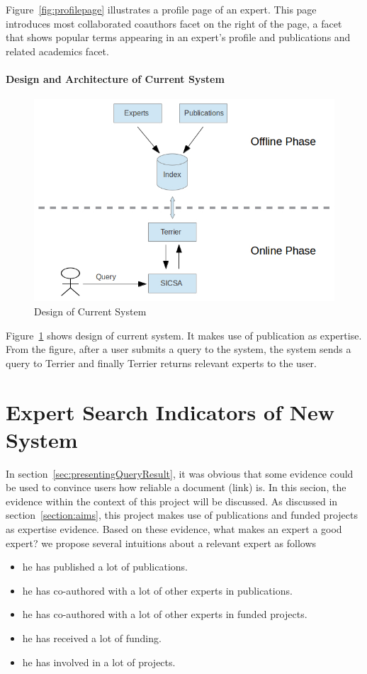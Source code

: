 Figure~\ref{fig:profilepage} illustrates a profile page of an expert. This page introduces most collaborated coauthors facet on the right of the page, a 
facet that shows popular terms appearing in an expert's profile and publications and related academics facet.

\paragraph{Design and Architecture of Current System}

 \begin{figure}
 \centering
 \includegraphics[scale=0.5,keepaspectratio]{./figures/currentSystemDesign.jpg}
 \caption{Design of Current System} \label{fig:currentDesign} 
\end{figure}
Figure~\ref{fig:currentDesign} shows design of current system. It makes use of publication as expertise. From the figure, after a user submits a query
to the system, the system sends a query to Terrier and finally Terrier returns relevant experts to the user.

\section{Expert Search Indicators of New System}\label{section:goodexpert}
In section~\ref{sec:presentingQueryResult}, it was obvious that some evidence could be used to convince users how reliable a document (link) is.
In this secion, the evidence within
the context of this project will be discussed. As discussed in section~\ref{section:aims}, this project makes use of publications and funded projects as 
expertise evidence. Based on these evidence, what makes an expert a good expert? we propose several intuitions about a relevant expert as follows 
\begin{itemize}
 \item he has published a lot of publications.
 \item he has co-authored with a lot of other experts in publications.
 \item he has co-authored with a lot of other experts in funded projects.
 \item he has received a lot of funding.
 \item he has involved in a lot of projects.
\end{itemize}


